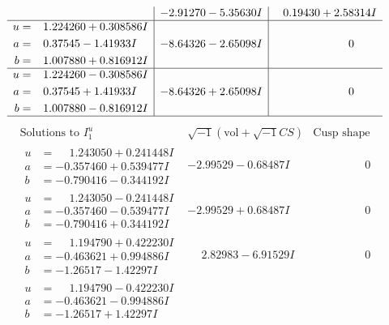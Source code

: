 \documentclass[1p]{elsarticle_modified}
\theoremstyle{definition}
\newcommand{\I}{\sqrt{-1}}
\begin{document}
$$\begin{array}{c|c|c}
 & -2.91270 - 5.35630 I & \phantom{-}0.19430 + 2.58314 I \\ \hline\begin{aligned}
u &= \phantom{-}1.224260 + 0.308586 I \\
a &= \phantom{-}0.37545 - 1.41933 I \\
b &= \phantom{-}1.007880 + 0.816912 I\end{aligned}
 & -8.64326 - 2.65098 I & \phantom{-0.000000 } 0 \\ \hline\begin{aligned}
u &= \phantom{-}1.224260 - 0.308586 I \\
a &= \phantom{-}0.37545 + 1.41933 I \\
b &= \phantom{-}1.007880 - 0.816912 I\end{aligned}
 & -8.64326 + 2.65098 I & \phantom{-0.000000 } 0\\
 \hline 
 \end{array}$$\newpage$$\begin{array}{c|c|c}  
\text{Solutions to }I^u_{1}& \I (\text{vol} + \sqrt{-1}CS) & \text{Cusp shape}\\
 \hline 
\begin{aligned}
u &= \phantom{-}1.243050 + 0.241448 I \\
a &= -0.357460 + 0.539477 I \\
b &= -0.790416 - 0.344192 I\end{aligned}
 & -2.99529 - 0.68487 I & \phantom{-0.000000 } 0 \\ \hline\begin{aligned}
u &= \phantom{-}1.243050 - 0.241448 I \\
a &= -0.357460 - 0.539477 I \\
b &= -0.790416 + 0.344192 I\end{aligned}
 & -2.99529 + 0.68487 I & \phantom{-0.000000 } 0 \\ \hline\begin{aligned}
u &= \phantom{-}1.194790 + 0.422230 I \\
a &= -0.463621 + 0.994886 I \\
b &= -1.26517 - 1.42297 I\end{aligned}
 & \phantom{-}2.82983 - 6.91529 I & \phantom{-0.000000 } 0 \\ \hline\begin{aligned}
u &= \phantom{-}1.194790 - 0.422230 I \\
a &= -0.463621 - 0.994886 I \\
b &= -1.26517 + 1.42297 I\end{aligned}

\end{array}$$
\end{document}
